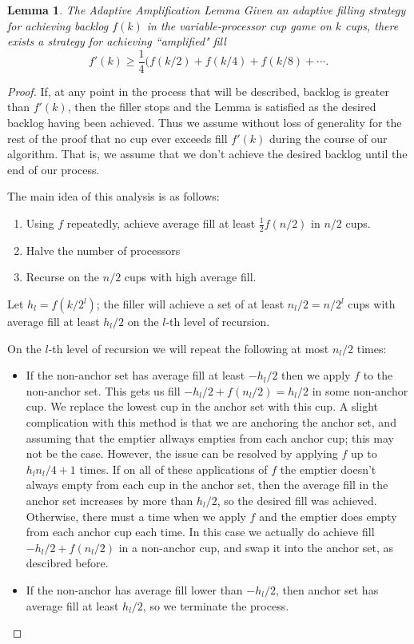 \documentclass[twocolumn]{article}[11pt]
\newtheorem{lemma}{Lemma}
\begin{document}
\begin{lemma}{The Adaptive Amplification Lemma}
  Given an adaptive filling strategy for achieving backlog $f(k)$ in the 
  variable-processor cup game on $k$ cups, there exists
  a strategy for achieving ``amplified" fill $$f'(k) \ge \frac{1}{4}(f(k/2) +
  f(k/4) + f(k/8) + \cdots .$$
\end{lemma}
\begin{proof}
  If, at any point in the process that will be described, backlog is greater
  than $f'(k)$, then the filler stops and the Lemma is satisfied as the desired
  backlog having been achieved. Thus we assume without loss of generality for
  the rest of the proof that no cup ever exceeds fill $f'(k)$ during the course
  of our algorithm. That is, we assume that we don't achieve the desired
  backlog until the end of our process.

  The main idea of this analysis is as follows:
  \begin{enumerate}
    \item Using $f$ repeatedly, achieve average fill at least $\frac{1}{2} f(n/2)$ in $n/2$ cups.
    \item Halve the number of processors
    \item Recurse on the $n/2$ cups with high average fill.
  \end{enumerate}

  Let $h_l = f(k/2^l)$; the filler will achieve a set of at
  least $n_l/2 = n/2^l$ cups with average fill at least $h_l / 2$ on the $l$-th
  level of recursion. 

  On the $l$-th level of recursion we will repeat the following at most $n_l/2$ times:
  \begin{itemize}
    \item If the non-anchor set has average fill at least $-h_l/2$ then we
      apply $f$ to the non-anchor set. This gets us fill $-h_l/2 + f(n_l/2) =
      h_l/2$ in some non-anchor cup. We replace the lowest cup in the anchor
      set with this cup. A slight complication with this method is that we are
      anchoring the anchor set, and assuming that the emptier allways empties
      from each anchor cup; this may not be the case. However, the issue can be
      resolved by applying $f$ up to $h_ln_l/4+1$ times. If on all of these
      applications of $f$ the emptier doesn't always empty from each cup in the
      anchor set, then the average fill in the anchor set increases by more
      than $h_l/2$, so the desired fill was achieved. Otherwise, there must a
      time when we apply $f$ and the emptier does empty from each anchor cup
      each time. In this case we actually do achieve fill $-h_l/2 + f(n_l/2)$
      in a non-anchor cup, and swap it into the anchor set, as descibred
      before.
    \item If the non-anchor has average fill lower
      than $-h_l/2$, then anchor set has average fill at least
      $h_l/2$, so we terminate the process.
  \end{itemize}
\end{proof}
\end{document}
